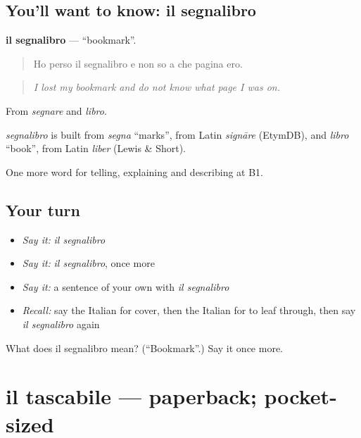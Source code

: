\subsection*{You'll want to know: il segnalibro}
\textbf{il segnalibro} — \textquotedblleft{}bookmark\textquotedblright{}.

\begin{quote}
Ho perso il segnalibro e non so a che pagina ero.
\end{quote}

\begin{quote}
\emph{I lost my bookmark and do not know what page I was on.}
\end{quote}

From \emph{segnare} and \emph{libro}.

\begin{cousinweb}
\emph{segnalibro} is built from \emph{segna} \textquotedblleft{}marks\textquotedblright{}, from Latin \emph{signāre} (EtymDB), and \emph{libro} \textquotedblleft{}book\textquotedblright{}, from Latin \emph{liber} (Lewis \& Short).
\end{cousinweb}

\begin{grammarlens}[title={What you've built}]
One more word for telling, explaining and describing at B1.
\end{grammarlens}

\subsection*{Your turn}
\begin{itemize}
\raggedright
  \item \emph{Say it:} \emph{il segnalibro}
  \item \emph{Say it:} \emph{il segnalibro}, once more
  \item \emph{Say it:} a sentence of your own with \emph{il segnalibro}
  \item \emph{Recall:} say the Italian for cover, then the Italian for to leaf through, then say \emph{il segnalibro} again
\end{itemize}

\begin{tcolorbox}[breakable,colback=teal!4,colframe=teal!35!black,title={Before you move on}]
What does il segnalibro mean? (\textquotedblleft{}Bookmark\textquotedblright{}.) Say it once more.
\end{tcolorbox}
\section[il tascabile]{il tascabile — paperback; pocket-sized}


